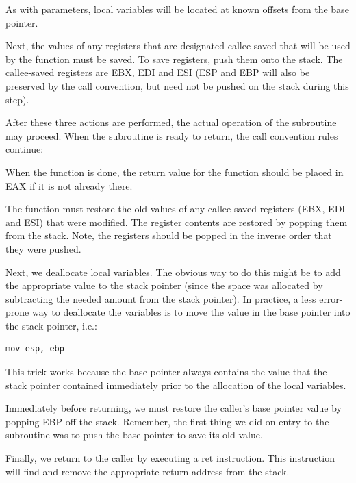 \begin{numlist}
As with parameters, local variables will be located at known offsets
from the base pointer.

\item Next, the values of any registers that are designated
  callee-saved that will be used by the function must be saved. To
  save registers, push them onto the stack. The callee-saved registers
  are EBX, EDI and ESI (ESP and EBP will also be preserved by the call
  convention, but need not be pushed on the stack during this step).

  After these three actions are performed, the actual operation of the
  subroutine may proceed.  When the subroutine is ready to return, the
  call convention rules continue:

\item When the function is done, the return value for the function
  should be placed in EAX if it is not already there.

\item The function must restore the old values of any callee-saved
  registers (EBX, EDI and ESI) that were modified. The register contents
  are restored by popping them from the stack. Note, the registers
  should be popped in the inverse order that they were pushed.

\item Next, we deallocate local variables. The obvious way to do this
  might be to add the appropriate value to the stack pointer (since
  the space was allocated by subtracting the needed amount from the
  stack pointer). In practice, a less error-prone way to deallocate
  the variables is to move the value in the base pointer into the
  stack pointer, i.e.:

\begin{lstlisting}[backgroundcolor=\color{white},frame=trBL,linewidth=3.75in,xleftmargin=2.25in,label={x86-callee-code-3.lst},language={[x86masm]Assembler},caption={x86 callee code, part 3}]
mov esp, ebp
\end{lstlisting}

This trick works because the base pointer always contains the value
that the stack pointer contained immediately prior to the allocation
of the local variables.

\item Immediately before returning, we must restore the caller's base
  pointer value by popping EBP off the stack. Remember, the first
  thing we did on entry to the subroutine was to push the base pointer
  to save its old value.

\item Finally, we return to the caller by executing a ret instruction. This instruction will find and
remove the appropriate return address from the stack.

\end{numlist}

